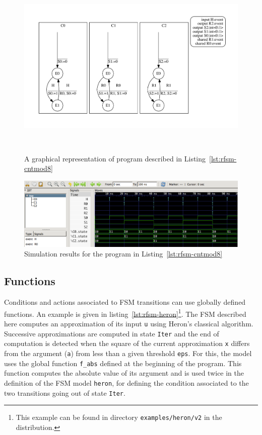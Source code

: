 \begin{figure}[h]
   \includegraphics[height=9cm]{figs/ctrmod8-top}
   \centering
  \caption{A graphical representation of program described in Listing~\ref{lst:rfsm-cntmod8}}
  \label{fig:rfsm-cntmod8-top}
\end{figure}

\begin{figure}[h]
   \includegraphics[width=\textwidth]{figs/ctrmod8-chrono}
   \centering
  \caption{Simulation results for the program in Listing~\ref{lst:rfsm-cntmod8}}
  \label{fig:rfsm-cntmod8-vcd}
\end{figure}

\subsection{Functions}
\label{sec:functions}

Conditions and actions associated to FSM transitions can use globally defined functions. An example
is given in listing~\ref{lst:rfsm-heron}\footnote{This example can be found in directory
  \texttt{examples/heron/v2} in the distribution.}. The FSM described here computes an approximation
of its input \verb|u| using Heron's classical algorithm. Successive approximations are computed in
state \verb|Iter| and the end of computation is detected when the square of the current
approximation \verb|x| differs from the argument (\verb|a|) from less than a given threshold
\verb|eps|. For this, the model uses the global function \verb|f_abs| defined at the beginning of
the program. This function computes the absolute value of its argument and is used twice in the
definition of the FSM model \verb|heron|, for defining the condition associated to the two
transitions going out of state \verb|Iter|.

